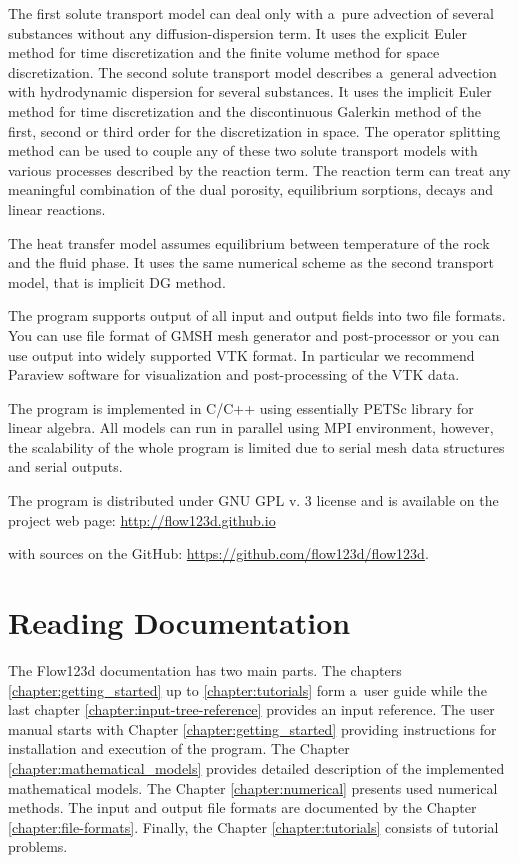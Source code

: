The first solute transport model can deal only with a~pure advection of several substances without any diffusion-dispersion term. It uses 
the explicit Euler method for time discretization and the finite volume method for space discretization.
The second solute transport model describes a~general advection with hydrodynamic dispersion for several substances. 
It uses the implicit Euler method for time discretization and the discontinuous Galerkin method of
the first, second or third order for the discretization in space.
The operator splitting method can be used to couple any of these two solute transport models with  
 various processes described by the reaction term.  The reaction term can treat any meaningful combination of the dual porosity, 
equilibrium sorptions, decays and linear reactions. 

The heat transfer model assumes equilibrium between temperature of the rock and the fluid phase. It uses the same numerical scheme as the second transport model, 
that is implicit DG method.

The program supports output of all input and output fields into two file formats. You can use file format of GMSH mesh generator and post-processor 
or you can use output into widely supported VTK format. In particular we recommend Paraview software for visualization and post-processing of the VTK data.

The program is implemented in C/C++ using essentially PETSc library for linear algebra. All models can run in parallel using MPI environment, however, 
the scalability of the whole program is limited due to serial mesh data structures and serial outputs.


The program is distributed under GNU GPL v. 3 license and is available on the project web page:
\url{http://flow123d.github.io}

with sources on the GitHub:
\url{https://github.com/flow123d/flow123d}.


\section{Reading Documentation}
The Flow123d documentation has two main parts. The chapters \ref{chapter:getting_started} up to \ref{chapter:tutorials} 
form a~user guide while the last chapter \ref{chapter:input-tree-reference} provides an input reference.
The user manual starts with Chapter \ref{chapter:getting_started} providing instructions for installation and execution of the program.
The Chapter \ref{chapter:mathematical_models} provides detailed description of the implemented mathematical models.
The Chapter \ref{chapter:numerical} presents used numerical methods. The input and output file formats are documented by the Chapter 
\ref{chapter:file-formats}. Finally, the Chapter \ref{chapter:tutorials}  consists of tutorial problems.

